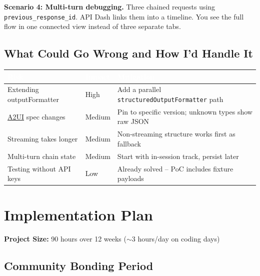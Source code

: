 \documentclass[11pt,a4paper]{article}
\begin{document}
\textbf{Scenario 4: Multi-turn debugging.} Three chained requests using \texttt{previous\_response\_id}. API Dash links them into a timeline. You see the full flow in one connected view instead of three separate tabs.

\subsection{What Could Go Wrong and How I'd Handle It}

\begin{center}
\begin{tabular}{|p{3.8cm}|p{1.8cm}|p{7.2cm}|}
\hline
\rowcolor{tblheader}
\textcolor{white}{\bfseries Risk} & \textcolor{white}{\bfseries Impact} & \textcolor{white}{\bfseries Mitigation} \\
\hline
\rowcolor{tblrowwhite}
Extending outputFormatter & High & Add a parallel \texttt{structuredOutputFormatter} path \\
\hline
\rowcolor{tblrowalt}
\href{https://github.com/google/A2UI}{A2UI} spec changes & Medium & Pin to specific version; unknown types show raw JSON \\
\hline
\rowcolor{tblrowwhite}
Streaming takes longer & Medium & Non-streaming structure works first as fallback \\
\hline
\rowcolor{tblrowalt}
Multi-turn chain state & Medium & Start with in-session track, persist later \\
\hline
\rowcolor{tblrowwhite}
Testing without API keys & Low & Already solved -- PoC includes fixture payloads \\
\hline
\end{tabular}
\end{center}

\newpage

\section{Implementation Plan}

\textbf{Project Size:} 90 hours over 12 weeks ($\sim$3 hours/day on coding days)

\subsection{Community Bonding Period}
\end{document}

